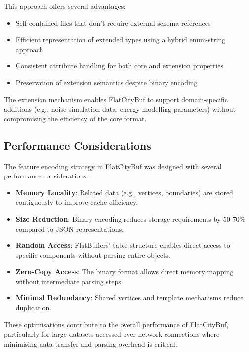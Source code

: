 This approach offers several advantages:
\begin{itemize}
    \item Self-contained files that don't require external schema references
    \item Efficient representation of extended types using a hybrid enum-string approach
    \item Consistent attribute handling for both core and extension properties
    \item Preservation of extension semantics despite binary encoding
\end{itemize}

The extension mechanism enables FlatCityBuf to support domain-specific additions (e.g., noise simulation data, energy modelling parameters) without compromising the efficiency of the core format.

\subsection{Performance Considerations}
\label{methodology:feature_encoding:performance_considerations}

The feature encoding strategy in FlatCityBuf was designed with several performance considerations:

\begin{itemize}
    \item \textbf{Memory Locality}: Related data (e.g., vertices, boundaries) are stored contiguously to improve cache efficiency.
    \item \textbf{Size Reduction}: Binary encoding reduces storage requirements by 50-70\% compared to JSON representations.
    \item \textbf{Random Access}: FlatBuffers' table structure enables direct access to specific components without parsing entire objects.
    \item \textbf{Zero-Copy Access}: The binary format allows direct memory mapping without intermediate parsing steps.
    \item \textbf{Minimal Redundancy}: Shared vertices and template mechanisms reduce duplication.
\end{itemize}

These optimisations contribute to the overall performance of FlatCityBuf, particularly for large datasets accessed over network connections where minimising data transfer and parsing overhead is critical.
